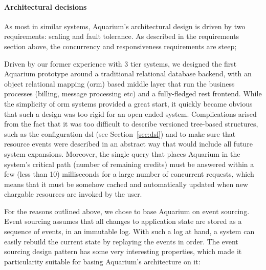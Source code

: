 \paragraph{Architectural decisions} As most in similar systems, Aquarium's architectural design is driven by two 
requirements: scaling and fault tolerance. As described in the requirements
section above, the concurrency and responsiveness requirements are steep;

Driven by our former experience with 3 tier systems, we designed the first
Aquarium prototype around a traditional relational database backend, with an
object relational mapping ({\sc orm}) based middle layer that run the business
processes (billing, message processing etc) and a fully-fledged {\sc rest}
frontend. While the simplicity of {\sc orm} systems provided a great start,
it quickly became obvious that such a design was too rigid for an open 
ended system. Complications arised from the fact that it was too difficult
to describe versioned tree-based structures, such as the configuration {\sc dsl} 
(see Section~\ref{sec:dsl}) and to make sure that resource events were
described in an abstract way that would include all future system expansions.
Moreover, the single query that places Aquarium in the system's critical 
path (number of remaining credits) must be answered within a few (less than
10) milliseconds for a large number of concurrent requests, which means that
it must be somehow cached and automatically updated when new chargable 
resources are invoked by the user.

For the reasons outlined above, we chose to base Aquarium on event sourcing. 
Event sourcing assumes that all changes to application
state are stored as a sequence of events, in an immutable log. With such a log
at hand, a system can easily rebuild the current state by replaying the events
in order. The event sourcing design pattern has some very interesting
properties, which made it particularity suitable for basing Aquarium's
architecture on it:


